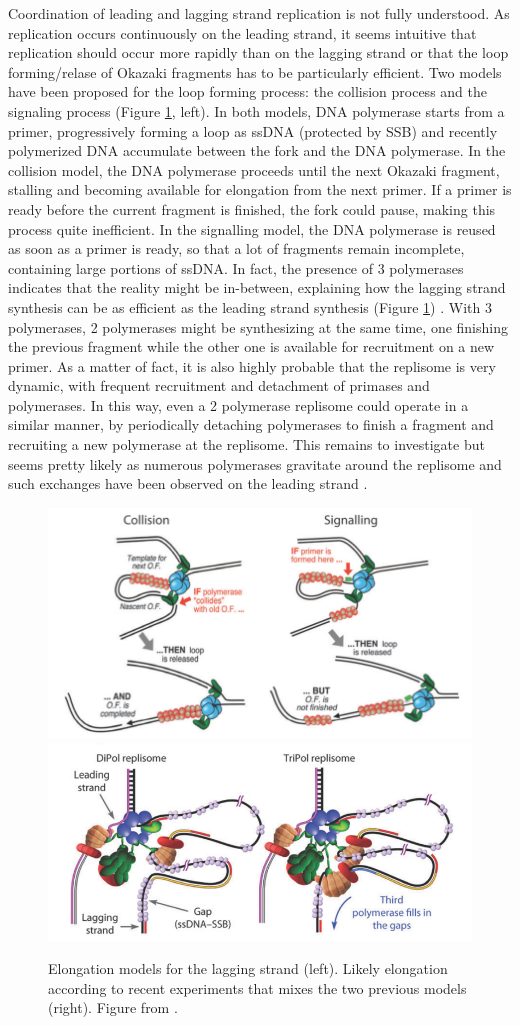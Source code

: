 Coordination of leading and lagging strand replication is not fully understood. As replication occurs continuously on the leading strand, it seems intuitive that replication should occur more rapidly than on the lagging strand or that the loop forming/relase of Okazaki fragments has to be particularly efficient. Two models have been proposed for the loop forming process: the collision process and the signaling process (Figure \ref{fig:replisomeElongation}, left). In both models, DNA polymerase starts from a primer, progressively forming a loop as ssDNA (protected by SSB) and recently polymerized DNA accumulate between the fork and the DNA polymerase. In the collision model, the DNA polymerase proceeds until the next Okazaki fragment, stalling and becoming available for elongation from the next primer. If a primer is ready before the current fragment is finished, the fork could pause, making this process quite inefficient. In the signalling model, the DNA polymerase is reused as soon as a primer is ready, so that a lot of fragments remain incomplete, containing large portions of ssDNA. In fact, the presence of 3 polymerases indicates that the reality might be in-between, explaining how the lagging strand synthesis can be as efficient as the leading strand synthesis (Figure \ref{fig:replisomeElongation}) \citep{stratmann_dna_2014,duderstadt_replication-fork_2014}. With 3 polymerases, 2 polymerases might be synthesizing at the same time, one finishing the previous fragment while the other one is available for recruitment on a new primer. As a matter of fact, it is also highly probable that the replisome is very dynamic, with frequent recruitment and detachment of primases and polymerases. In this way, even a 2 polymerase replisome could operate in a similar manner, by periodically detaching polymerases to finish a fragment and recruiting a new polymerase at the replisome. This remains to investigate but seems pretty likely as numerous polymerases gravitate around the replisome and such exchanges have been observed on the leading strand \citep{stratmann_dna_2014}.
\begin{figure}[!ht]
	\centering
	\includegraphics[width=0.49\linewidth]{figure/replisomeElongation}
	\includegraphics[width=0.49\linewidth]{figure/replisomeThreePolymerases}
	\caption{Elongation models for the lagging strand (left). Likely elongation according to recent experiments that mixes the two previous models (right). Figure from \citet{stratmann_dna_2014}.}
	\label{fig:replisomeElongation}
\end{figure}

